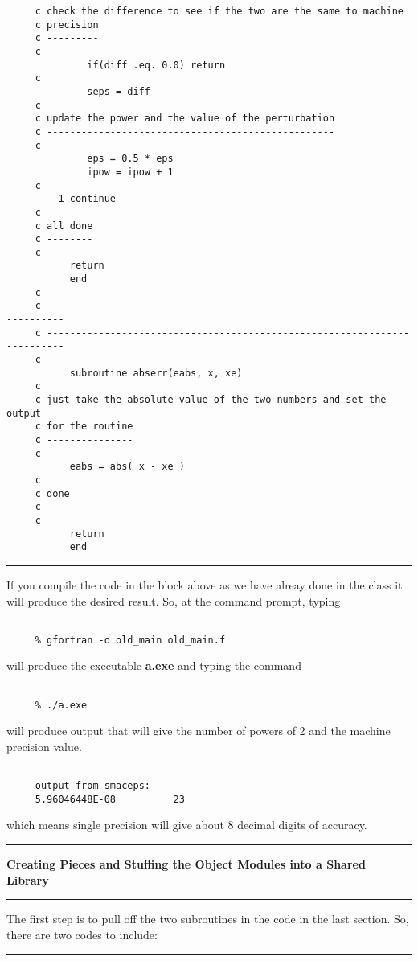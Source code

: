 \documentclass[10pt,fleqn]{article}
\begin{document}
\begin{verbatim}
     c check the difference to see if the two are the same to machine
     c precision
     c ---------
     c
              if(diff .eq. 0.0) return
     c
              seps = diff
     c
     c update the power and the value of the perturbation
     c --------------------------------------------------
     c
              eps = 0.5 * eps
              ipow = ipow + 1
     c
         1 continue
     c
     c all done
     c --------
     c
           return
           end
     c
     c -------------------------------------------------------------------------
     c -------------------------------------------------------------------------
     c
           subroutine abserr(eabs, x, xe)
     c
     c just take the absolute value of the two numbers and set the output
     c for the routine
     c ---------------
     c
           eabs = abs( x - xe )
     c
     c done
     c ----
     c
           return
           end
\end{verbatim}
\vskip0.1in\hrule\vskip0.1in
\noindent
If you compile the code in the block above as we have alreay done in the class
it will produce the desired result. So, at the command prompt, typing
\begin{verbatim}

     % gfortran -o old_main old_main.f

\end{verbatim}
will produce the executable {\bf a.exe} and typing the command
\begin{verbatim}

     % ./a.exe

\end{verbatim}
will produce output that will give the number of powers of 2 and the machine
precision value.
\begin{verbatim}

     output from smaceps:
     5.96046448E-08          23

\end{verbatim}
which means single precision will give about 8 decimal digits of accuracy.
\vskip0.1in\hrule\vskip0.1in
{\large{\bf
   Creating Pieces and Stuffing the Object Modules into a Shared Library
}}
\vskip0.1in\hrule\vskip0.1in
The first step is to pull off the two subroutines in the code in the last
section. So, there are two codes to include:
\vskip0.1in\hrule\vskip0.1in
\end{document}
